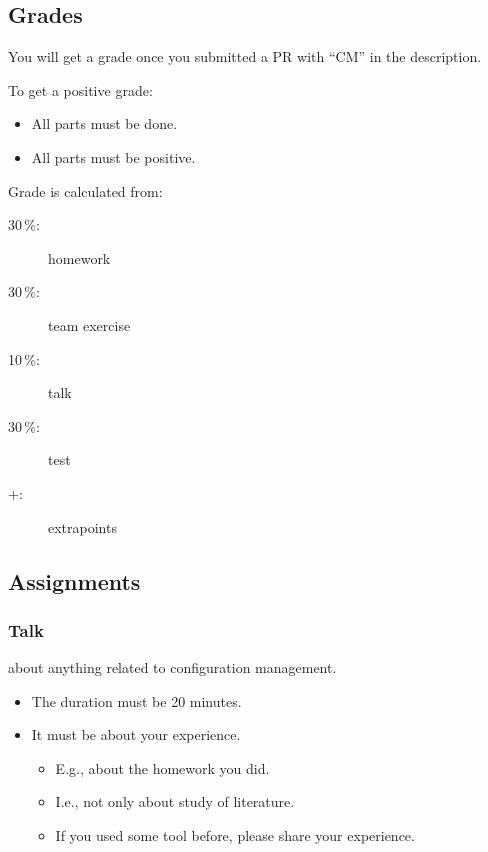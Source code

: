 \subsection{Grades}

\begin{frame}
	You will get a grade once you submitted a PR with ``CM'' in the description.
	\vspace{1cm}

	To get a positive grade:
	\begin{itemize}
		\item All parts must be done.
		\item All parts must be positive.
	\end{itemize}
\end{frame}

\begin{frame}
	Grade is calculated from:
	\begin{description}
	\item[30\,\%:] homework
	\item[30\,\%:] team exercise
	\item[10\,\%:] talk
	\item[30\,\%:] test
	\item[+:] extrapoints
	\end{description}
\end{frame}

\subsection{Assignments}
\begin{frame}
	\frametitle{Talk}
	about anything related to configuration management.
	\begin{itemize}
		\item The duration must be 20 minutes.
		\item It must be about your experience.
		\begin{itemize}
			\item E.g., about the homework you did.
			\item I.e., not only about study of literature.
			\item If you used some tool before, please share your experience.
		\end{itemize}
	\end{itemize}
\end{frame}

